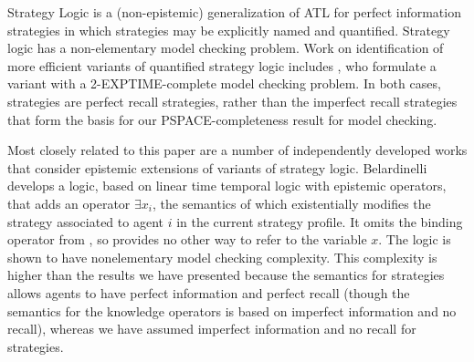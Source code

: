 \documentclass[a4wide]{article}
\theoremstyle{examplesty}
\begin{document}
Strategy Logic \cite{CHP10} is a (non-epistemic) generalization of  ATL for perfect information 
strategies in which strategies may be explicitly named and quantified. 
Strategy logic  has a non-elementary model checking problem. Work on identification of more efficient variants 
of quantified strategy logic includes \cite{MogaveroMV10}, who formulate a variant 
with a 2-EXPTIME-complete model checking problem. In both cases, strategies are perfect recall strategies, rather than the imperfect recall 
strategies that form the basis for our PSPACE-completeness result for model checking. 


Most closely related to this paper are a number of independently developed 
works that consider epistemic extensions of variants 
of strategy logic.  Belardinelli \cite{Belardinelli14} develops a logic, 
based on linear time temporal logic with epistemic operators, that adds an operator 
$\exists x_i$, the semantics of which existentially modifies the 
strategy associated to agent $i$ in the current strategy profile. 
It omits the binding operator from \cite{MogaveroMV10}, so 
provides no other way to refer to the variable $x$. 
The logic is shown to have nonelementary model checking 
complexity. This complexity is higher than the results we have presented
because the semantics for strategies allows agents to have perfect 
information and perfect recall (though the semantics for the 
knowledge operators is based on imperfect information 
and no recall), whereas we have assumed imperfect information 
and no recall for strategies.  
\end{document}
